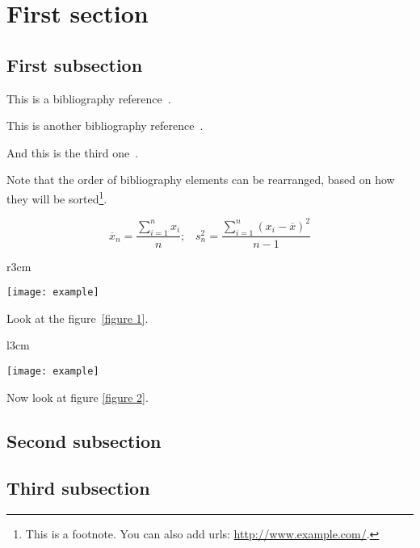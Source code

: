 \section{First section}

\subsection{First subsection}
This is a bibliography reference~\cite{Little:1961:PQF:2772689.2772699}.

This is another bibliography reference~\cite{Kemeny}.

And this is the third one~\cite{Apache}.

Note that the order of bibliography elements can be rearranged, based on how they will be sorted\footnote{This is a footnote. You can also add urls: \url{http://www.example.com/}.}.

\begin{equation}
	\overline{x}_n = \frac{\sum_{i=1}^n x_i}{n}; \;\;\; s^2_n = \frac{\sum_{i=1}^n (x_i-\overline{x})^2}{n-1}
\end{equation}

\begin{wrapfigure}{r}{3cm} %
	\begin{center}
		\texttt{[image: example]}
	\end{center}
	\caption{Photo example}
	\label{figure 1}
\end{wrapfigure}

\lipsum[1]

Look at the figure~\ref{figure 1}. %
\lipsum[2]

\begin{wrapfigure}{l}{3cm}
	\begin{center}
		\texttt{[image: example]}
	\end{center}
	\caption{Photo example}
	\label{figure 2}
\end{wrapfigure}

Now look at figure \ref{figure 2}.
\lipsum[4-10]

\subsection{Second subsection}
\lipsum[2-3]
\lipsum[4]

\subsection{Third subsection}
\lipsum[5-7]
